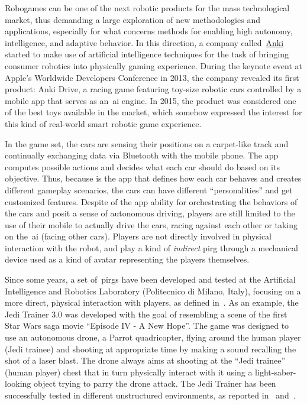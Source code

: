 Robogames can be one of the next robotic products for the mass technological market, thus demanding a large exploration of new methodologies and applications, especially for what concerns methods for enabling high autonomy, intelligence, and adaptive behavior. In this direction, a company called~\href{https://anki.com/en-us}{Anki} started to make use of artificial intelligence techniques for the task of bringing consumer robotics into physically gaming experience. During the keynote event at Apple's Worldwide Developers Conference in 2013, the company revealed its first product: Anki Drive, a racing game featuring toy-size robotic cars controlled by a mobile app that serves as an~\gls{ai} engine. In 2015, the product was considered one of the best toys available in the market, which somehow expressed the interest for this kind of real-world smart robotic game experience. 

In the game set, the cars are sensing their positions on a carpet-like track and continually exchanging data via Bluetooth with the mobile phone. The app computes possible actions and decides what each car should do based on its objective. Thus, because is the app that defines how each car behaves and creates different gameplay scenarios, the cars can have different ``personalities'' and get customized features. Despite of the app ability for orchestrating the behaviors of the cars and posit a sense of autonomous driving, players are still limited to the use of their mobile to actually drive the cars, racing against each other or taking on the~\gls{ai} (facing other cars). Players are not directly involved in physical interaction with the robot, and play a kind of \textit{indirect} \gls{pirg} through a mechanical device used as a kind of avatar representing the players themselves.

Since some years, a set of~\gls{pirg}s have been developed and tested at the Artificial Intelligence and Robotics Laboratory (Politecnico di Milano, Italy), focusing on a more direct, physical interaction with players, as defined in~\cite{martinoia_physically_2013}. As an example, the Jedi Trainer 3.0 was developed with the goal of resembling a scene of the first Star Wars saga movie ``Episode IV - A New Hope''. The game was designed to use an autonomous drone, a Parrot quadricopter, flying around the human player (Jedi trainee) and shooting at appropriate time by making a sound recalling the shot of a laser blast. The drone always aims at shooting at the ``Jedi trainee'' (human player) chest that in turn physically interact with it using a light-saber-looking object trying to parry the drone attack. The Jedi Trainer has been successfully tested in different unstructured environments, as reported in~\cite{bonarini_timing_2014} and~\cite{martinoia_physically_2013}.

